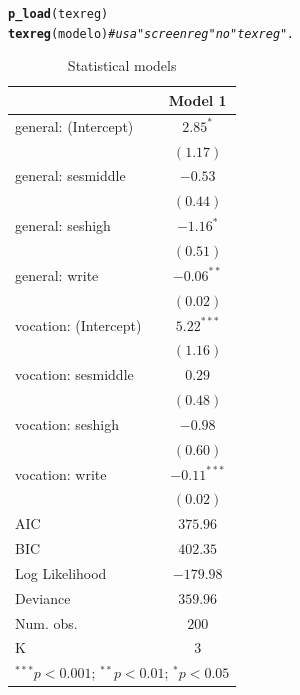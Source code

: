 \documentclass[onesided]{article}\usepackage[]{graphicx}\usepackage[]{color}
\makeatletter
\newcommand{\hlcom}[1]{\textcolor[rgb]{0.678,0.584,0.686}{\textit{#1}}}%
\newcommand{\hlstd}[1]{\textcolor[rgb]{0.345,0.345,0.345}{#1}}%
\newcommand{\hlkwd}[1]{\textcolor[rgb]{0.737,0.353,0.396}{\textbf{#1}}}%
\newenvironment{kframe}{%
 \def\at@end@of@kframe{}%
 \ifinner\ifhmode%
  \def\at@end@of@kframe{\end{minipage}}%
  \begin{minipage}{\columnwidth}%
 \fi\fi%
 \def\FrameCommand##1{\hskip\@totalleftmargin \hskip-\fboxsep
 \colorbox{shadecolor}{##1}\hskip-\fboxsep
     \hskip-\linewidth \hskip-\@totalleftmargin \hskip\columnwidth}%
 \MakeFramed {\advance\hsize-\width
   \@totalleftmargin\z@ \linewidth\hsize
   \@setminipage}}%
 {\par\unskip\endMakeFramed%
 \at@end@of@kframe}
\makeatother
\begin{document}
\begin{kframe}
\begin{alltt}
\hlkwd{p_load}\hlstd{(texreg)}
\hlkwd{texreg}\hlstd{(modelo)} \hlcom{# usa "screenreg" no "texreg".}
\end{alltt}
\end{kframe}
\begin{table}
\begin{center}
\begin{tabular}{l c}
\hline
 & Model 1 \\
\hline
general: (Intercept)  & $2.85^{*}$    \\
                      & $(1.17)$      \\
general: sesmiddle    & $-0.53$       \\
                      & $(0.44)$      \\
general: seshigh      & $-1.16^{*}$   \\
                      & $(0.51)$      \\
general: write        & $-0.06^{**}$  \\
                      & $(0.02)$      \\
vocation: (Intercept) & $5.22^{***}$  \\
                      & $(1.16)$      \\
vocation: sesmiddle   & $0.29$        \\
                      & $(0.48)$      \\
vocation: seshigh     & $-0.98$       \\
                      & $(0.60)$      \\
vocation: write       & $-0.11^{***}$ \\
                      & $(0.02)$      \\
\hline
AIC                   & $375.96$      \\
BIC                   & $402.35$      \\
Log Likelihood        & $-179.98$     \\
Deviance              & $359.96$      \\
Num. obs.             & $200$         \\
K                     & $3$           \\
\hline
\multicolumn{2}{l}{\scriptsize{$^{***}p<0.001$; $^{**}p<0.01$; $^{*}p<0.05$}}
\end{tabular}
\caption{Statistical models}
\label{table:coefficients}
\end{center}
\end{table}
\end{document}
